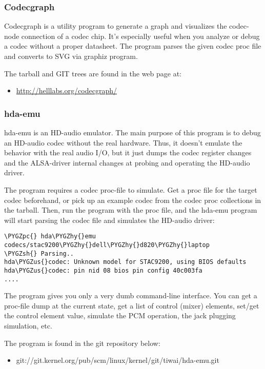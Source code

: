 \documentclass[a4paper,8pt,english]{sphinxmanual}
\def\PYGZus{\char`\_}
\def\PYGZsh{\char`\#}
\def\PYGZpc{\char`\%}
\def\PYGZhy{\char`\-}
\begin{document}
\subsubsection{Codecgraph}
\label{sound/hd-audio/notes:codecgraph}
Codecgraph is a utility program to generate a graph and visualizes the
codec-node connection of a codec chip.  It's especially useful when
you analyze or debug a codec without a proper datasheet.  The program
parses the given codec proc file and converts to SVG via graphiz
program.

The tarball and GIT trees are found in the web page at:
\begin{itemize}
\item {} 
\href{http://helllabs.org/codecgraph/}{http://helllabs.org/codecgraph/}

\end{itemize}


\subsubsection{hda-emu}
\label{sound/hd-audio/notes:hda-emu}
hda-emu is an HD-audio emulator.  The main purpose of this program is
to debug an HD-audio codec without the real hardware.  Thus, it
doesn't emulate the behavior with the real audio I/O, but it just
dumps the codec register changes and the ALSA-driver internal changes
at probing and operating the HD-audio driver.

The program requires a codec proc-file to simulate.  Get a proc file
for the target codec beforehand, or pick up an example codec from the
codec proc collections in the tarball.  Then, run the program with the
proc file, and the hda-emu program will start parsing the codec file
and simulates the HD-audio driver:

\begin{Verbatim}[commandchars=\\\{\}]
\PYGZpc{} hda\PYGZhy{}emu codecs/stac9200\PYGZhy{}dell\PYGZhy{}d820\PYGZhy{}laptop
\PYGZsh{} Parsing..
hda\PYGZus{}codec: Unknown model for STAC9200, using BIOS defaults
hda\PYGZus{}codec: pin nid 08 bios pin config 40c003fa
....
\end{Verbatim}

The program gives you only a very dumb command-line interface.  You
can get a proc-file dump at the current state, get a list of control
(mixer) elements, set/get the control element value, simulate the PCM
operation, the jack plugging simulation, etc.

The program is found in the git repository below:
\begin{itemize}
\item {} 
git://git.kernel.org/pub/scm/linux/kernel/git/tiwai/hda-emu.git

\end{itemize}
\end{document}
